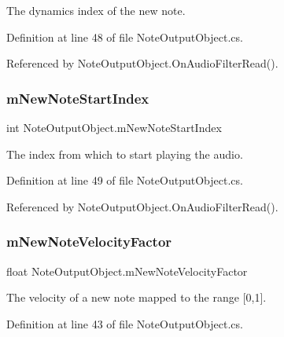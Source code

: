 The dynamics index of the new note. 



Definition at line 48 of file Note\+Output\+Object.\+cs.



Referenced by Note\+Output\+Object.\+On\+Audio\+Filter\+Read().

\mbox{\label{group___n_o_o_priv_var_ga93720712088a4b6f91abe63d6f07a2c2}} 
\subsubsection{\texorpdfstring{m\+New\+Note\+Start\+Index}{mNewNoteStartIndex}}
{\footnotesize\ttfamily int Note\+Output\+Object.\+m\+New\+Note\+Start\+Index\hspace{0.3cm}{\ttfamily [private]}}



The index from which to start playing the audio. 



Definition at line 49 of file Note\+Output\+Object.\+cs.



Referenced by Note\+Output\+Object.\+On\+Audio\+Filter\+Read().

\mbox{\label{group___n_o_o_priv_var_gaf3cd650d21c56c25ce988d9f75279278}} 
\subsubsection{\texorpdfstring{m\+New\+Note\+Velocity\+Factor}{mNewNoteVelocityFactor}}
{\footnotesize\ttfamily float Note\+Output\+Object.\+m\+New\+Note\+Velocity\+Factor\hspace{0.3cm}{\ttfamily [private]}}



The velocity of a new note mapped to the range \mbox{[}0,1\mbox{]}. 



Definition at line 43 of file Note\+Output\+Object.\+cs.



